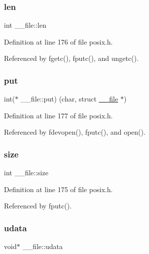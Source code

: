 \subsubsection{\texorpdfstring{len}{len}}
{\footnotesize\ttfamily int \+\_\+\+\_\+file\+::len}



Definition at line 176 of file posix.\+h.



Referenced by fgetc(), fputc(), and ungetc().

\mbox{\label{struct____file_a01c8b217e42cc11b6a7f8429114e9d46}} 
\subsubsection{\texorpdfstring{put}{put}}
{\footnotesize\ttfamily int($\ast$ \+\_\+\+\_\+file\+::put) (char, struct \hyperlink{struct____file}{\+\_\+\+\_\+file} $\ast$)}



Definition at line 177 of file posix.\+h.



Referenced by fdevopen(), fputc(), and open().

\mbox{\label{struct____file_aff4a1ca8b6a12460812928afae81248d}} 
\subsubsection{\texorpdfstring{size}{size}}
{\footnotesize\ttfamily int \+\_\+\+\_\+file\+::size}



Definition at line 175 of file posix.\+h.



Referenced by fputc().

\mbox{\label{struct____file_abe6f3bdb4df4119277132eb3e13a4628}} 
\subsubsection{\texorpdfstring{udata}{udata}}
{\footnotesize\ttfamily void$\ast$ \+\_\+\+\_\+file\+::udata}



